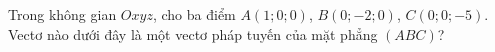 \begin{ex}
Trong không gian $Oxyz$, cho ba điểm $A(1;0;0)$, $B(0;-2;0)$, $C(0;0;-5)$. Vectơ nào dưới đây là một vectơ pháp tuyến của mặt phẳng $(ABC)$?
\end{ex}
